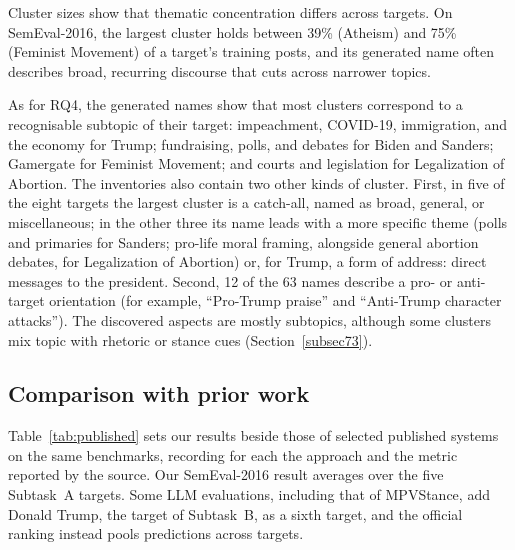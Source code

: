 \documentclass[pdflatex,sn-mathphys-num,iicol]{sn-jnl}%
\begin{document}
Cluster sizes show that thematic concentration differs across targets. On SemEval-2016, the largest cluster holds between 39\% (Atheism) and 75\% (Feminist Movement) of a target's training posts, and its generated name often describes broad, recurring discourse that cuts across narrower topics.

As for RQ4, the generated names show that most clusters correspond to a recognisable subtopic of their target: impeachment, COVID-19, immigration, and the economy for Trump; fundraising, polls, and debates for Biden and Sanders; Gamergate for Feminist Movement; and courts and legislation for Legalization of Abortion. The inventories also contain two other kinds of cluster. First, in five of the eight targets the largest cluster is a catch-all, named as broad, general, or miscellaneous; in the other three its name leads with a more specific theme (polls and primaries for Sanders; pro-life moral framing, alongside general abortion debates, for Legalization of Abortion) or, for Trump, a form of address: direct messages to the president. Second, 12 of the 63 names describe a pro- or anti-target orientation (for example, ``Pro-Trump praise'' and ``Anti-Trump character attacks''). The discovered aspects are mostly subtopics, although some clusters mix topic with rhetoric or stance cues (Section~\ref{subsec73}).

\subsection{Comparison with prior work}\label{sec:published}

Table~\ref{tab:published} sets our results beside those of selected published systems on the same benchmarks, recording for each the approach and the metric reported by the source. Our SemEval-2016 result averages over the five Subtask~A targets. Some LLM evaluations, including that of MPVStance, add Donald Trump, the target of Subtask~B, as a sixth target, and the official ranking instead pools predictions across targets.
\end{document}
